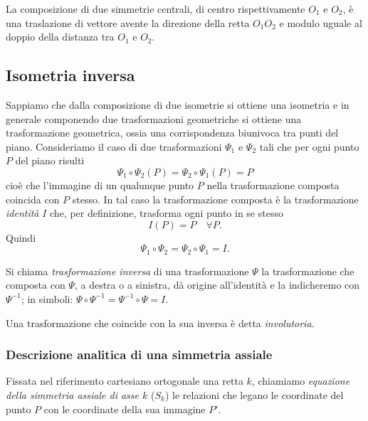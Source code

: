 \begin{proposizione}
La composizione di due simmetrie centrali, di centro rispettivamente 
$O_1$ e $O_2$, è una traslazione di vettore avente la direzione della 
retta $O_1O_2$ e modulo uguale al doppio della distanza tra $O_1$ e 
$O_2$.
\end{proposizione}
			
			
\subsection{Isometria inversa}
			
Sappiamo che dalla composizione di due isometrie si ottiene una 
isometria e in generale componendo due trasformazioni geometriche si 
ottiene una trasformazione geometrica, ossia una corrispondenza 
biunivoca tra punti del piano.
Consideriamo il caso di due trasformazioni $\Psi_1$ e $\Psi_2$ tali 
che per ogni punto $P$ del piano risulti
\[\Psi_1 \circ \Psi_2 (P) = \Psi_2 \circ \Psi_1 (P) = P\]
cioè che l'immagine di un qualunque punto $P$ nella trasformazione 
composta coincida con $P$ stesso. In tal caso la trasformazione 
composta è la trasformazione \emph{identità} $I$ che, per 
definizione, trasforma ogni punto in se stesso
\[I(P) = P\quad \forall P.\]
Quindi
\[\Psi_1 \circ \Psi_2 = \Psi_2 \circ \Psi_1 = I.\]

\begin{definizione}
Si chiama \emph{trasformazione inversa} di una trasformazione $\Psi$ 
la trasformazione che composta con $\Psi$, a destra o a sinistra, dà 
origine all'identità e la indicheremo con $\Psi^{-1}$; in simboli: 
$\Psi \circ \Psi^{-1} = \Psi^{-1} \circ \Psi = I$.
\end{definizione}
			
\begin{definizione}
Una trasformazione che coincide con la sua inversa è detta 
\emph{involutoria}.
\end{definizione}

\subsubsection{Descrizione analitica di una simmetria assiale}

\begin{definizione}
	Fissata nel riferimento cartesiano ortogonale una retta $k$, 
	chiamiamo \emph{equazione della simmetria assiale di asse $k$} ($S_k$) 
	le relazioni che legano le coordinate del punto $P$ con le coordinate 
	della sua immagine $P'$.
\end{definizione}

